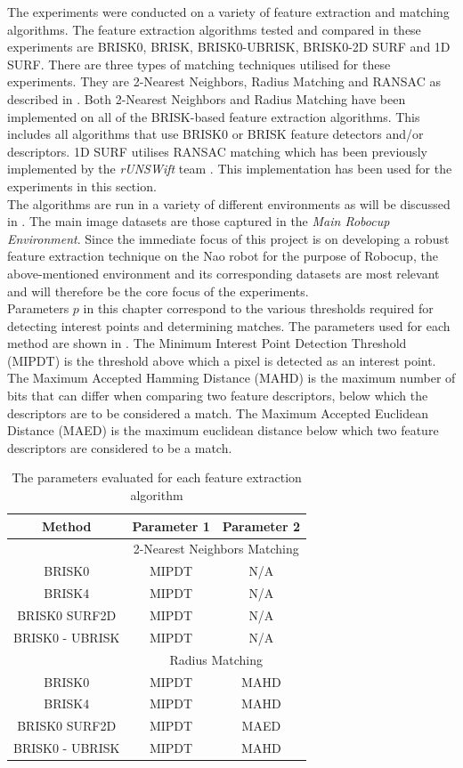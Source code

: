 \documentclass{report}
\begin{document}
The experiments were conducted on a variety of feature extraction and matching algorithms. The feature extraction algorithms tested and compared in these experiments are BRISK0, BRISK, BRISK0-UBRISK, BRISK0-2D SURF and 1D SURF. There are three types of matching techniques utilised for these experiments. They are 2-Nearest Neighbors, Radius Matching and RANSAC as described in . Both 2-Nearest Neighbors and Radius Matching have been implemented on all of the BRISK-based feature extraction algorithms. This includes all algorithms that use BRISK0 or BRISK feature detectors and/or descriptors. 1D SURF utilises RANSAC matching which has been previously implemented by the \textit{rUNSWift} team \cite{Anderson}. This implementation has been used for the experiments in this section.\\ 

The algorithms are run in a variety of different environments as will be discussed in . The main image datasets are those captured in the \textit{Main Robocup Environment}. Since the immediate focus of this project is on developing a robust feature extraction technique on the Nao robot for the purpose of Robocup, the above-mentioned environment  and its corresponding datasets are most relevant and will therefore be the core focus of the experiments.\\

Parameters $p$ in this chapter correspond to the various thresholds required for detecting interest points and determining matches. The parameters used for each method are shown in . The Minimum Interest Point Detection Threshold (MIPDT) is the threshold above which a pixel is detected as an interest point. The Maximum Accepted Hamming Distance (MAHD) is the maximum number of bits that can differ when comparing two feature descriptors, below which the descriptors are to be considered a match. The Maximum Accepted Euclidean Distance (MAED) is the maximum euclidean distance below which two feature descriptors are considered to be a match.\\

\begin{table}
\caption{The parameters evaluated for each feature extraction algorithm}
\begin{tabular}{|c|c|c|}
\hline 
Method & Parameter 1 & Parameter 2\tabularnewline
\hline 
 & \multicolumn{2}{c}{2-Nearest Neighbors Matching}\tabularnewline
\hline 
BRISK0 & MIPDT & N/A\tabularnewline
\hline 
BRISK4 & MIPDT & N/A\tabularnewline
\hline 
BRISK0 SURF2D & MIPDT & N/A\tabularnewline
\hline 
BRISK0 - UBRISK & MIPDT & N/A\tabularnewline
\hline 
 & \multicolumn{2}{c}{Radius Matching}\tabularnewline
\hline 
BRISK0 & MIPDT & MAHD\tabularnewline
\hline 
BRISK4 & MIPDT & MAHD\tabularnewline
\hline 
BRISK0 SURF2D & MIPDT & MAED\tabularnewline
\hline 
BRISK0 - UBRISK & MIPDT & MAHD\tabularnewline
\hline 
\end{tabular}
\label{tab:parameters}
\end{table}
\end{document}
